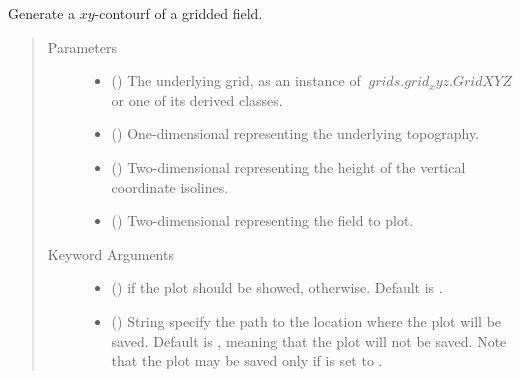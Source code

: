 \documentclass[letterpaper,10pt,english]{sphinxmanual}
\begin{document}
\begin{fulllineitems}
\label{\detokenize{api:utils.utils_plot.contourf_xy}}
Generate a \(xy\)-contourf of a gridded field.
\begin{quote}\begin{description}
\item[{Parameters}] \leavevmode\begin{itemize}
\item {} 
 () \textendash{} The underlying grid, as an instance of \(~grids.grid_xyz.GridXYZ\) or one of its derived classes.

\item {} 
 () \textendash{} One-dimensional  representing the underlying topography.

\item {} 
 () \textendash{} Two-dimensional  representing the height of the vertical coordinate isolines.

\item {} 
 () \textendash{} Two-dimensional  representing the field to plot.

\end{itemize}

\item[{Keyword Arguments}] \leavevmode\begin{itemize}
\item {} 
 () \textendash{}  if the plot should be showed,  otherwise. Default is .

\item {} 
 () \textendash{} String specify the path to the location where the plot will be saved. Default is , meaning that the plot
will not be saved. Note that the plot may be saved only if  is set to .


\end{itemize}
\end{description}
\end{quote}
\end{fulllineitems}
\end{document}
